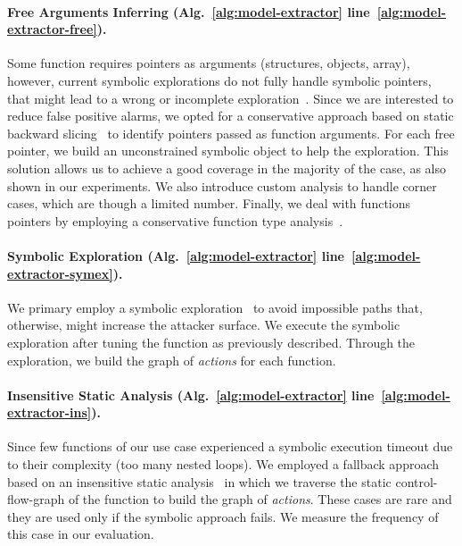 \paragraph{Free Arguments Inferring (Alg.~\ref{alg:model-extractor} 
	line~\ref{alg:model-extractor-free}).}
Some function requires pointers as arguments (\eg structures, objects, array), 
however, current symbolic explorations do not fully handle symbolic 
pointers, that might lead to a wrong or incomplete 
exploration~\citep{coppa2017rethinking}.
Since we are interested to reduce false positive alarms, we opted for a 
conservative approach based on static backward slicing~\citep{slicing}
to identify pointers passed as function arguments.
For each free pointer, we build an unconstrained symbolic object to help 
the exploration.
This solution allows us to achieve a good coverage in 
the majority of the case, as also shown in our experiments. We also 
introduce custom analysis to handle corner cases, which are though a 
limited number.
Finally, we deal with functions pointers by employing a conservative function 
type analysis~\citep{abadi2009control}.

\paragraph{Symbolic Exploration (Alg.~\ref{alg:model-extractor} 
	line~\ref{alg:model-extractor-symex}).}
We primary employ a symbolic exploration~\citep{king1976symbolic} to avoid 
impossible paths that, otherwise, might increase the attacker surface.
We execute the symbolic exploration after tuning the function as previously 
described.
Through the exploration, we build the graph of \emph{actions} for each 
function. 

\paragraph{Insensitive Static Analysis (Alg.~\ref{alg:model-extractor} 	
	line~\ref{alg:model-extractor-ins}).}
Since few functions of our use case experienced a symbolic execution timeout 
due to their complexity (\ie too many nested loops).
We employed a fallback approach based on an insensitive static 
analysis~\citep{sarkar2007flow} in which we traverse the static 
control-flow-graph of the function to build the graph of \emph{actions}.
These cases are rare and they are used only if the symbolic approach fails.
We measure the frequency of this case in our evaluation.

